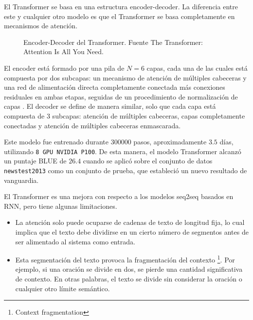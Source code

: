 \documentclass[conference]{IEEEtran}
\begin{document}
El Transformer se basa en una estructura encoder-decoder. La diferencia entre este y cualquier otro modelo es que el Transformer se basa completamente en mecanismos de atenci\'on. 

\begin{figure}[h]
\caption{Encoder-Decoder del Transformer. Fuente The Transformer:
Attention Is All You Need. \cite{b1}}
\end{figure}

\vspace{0.2cm}


El encoder est\'a formado por una pila de $N = 6$ capas, cada una de las cuales est\'a compuesta por dos subcapas: un mecanismo de atenci\'on de m\'ultiples cabeceras y una red de alimentaci\'on directa completamente conectada m\'as conexiones residuales \cite{b2} en ambas etapas, seguidas de un procedimiento de normalizaci\'on de capas \cite{b3}. El decoder se define de manera similar, solo que cada capa est\'a compuesta de 3 subcapas: atenci\'on de m\'ultiples cabeceras, capas completamente conectadas y atenci\'on de m\'ultiples cabeceras enmascarada.

\vspace{0.2cm}

Este modelo fue entrenado durante $300000$ pasos, aproximadamente $3.5$ d\'ias, utilizando \texttt{8 GPU NVIDIA P100}. De esta manera, el modelo Transformer alcanz\'o un puntaje BLUE \cite{b4} de $26.4$ cuando se aplic\'o sobre el conjunto de datos \texttt{newstest2013} como un conjunto de prueba, que estableci\'o un nuevo resultado de vanguardia.
\vspace{0.2cm}

El Transformer es una mejora con respecto a los modelos seq2seq basados en RNN, pero tiene algunas limitaciones.

\begin{itemize}
\item La atenci\'on solo puede ocuparse de cadenas de texto de longitud fija, lo cual implica que el texto debe dividirse en un cierto n\'umero de segmentos antes de ser alimentado al sistema como entrada. 

\item Esta segmentaci\'on del texto provoca la fragmentaci\'on del contexto \footnote{Context fragmentation}. Por ejemplo, si una oraci\'on se divide en dos, se pierde una cantidad significativa de contexto. En otras palabras, el texto se divide sin considerar la oraci\'on o cualquier otro l\'imite sem\'antico.
\end{itemize}
\end{document}
